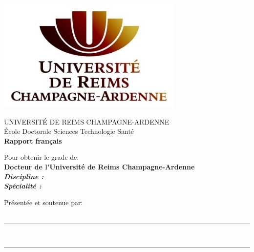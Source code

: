 \documentclass[12pt,a4paper]{report}
\begin{document}
{
\centering

{
	\includegraphics[scale=1]{../figures/style/logo_urca_front_page.jpg}
	\vspace{0.3cm}
}

{
	UNIVERSIT\'E DE REIMS CHAMPAGNE-ARDENNE\\
	\vspace{0.5cm}
	\'Ecole Doctorale Sciences Technologie Sant\'e\\
	\vspace{.5cm}
	\huge
	\textbf{Rapport français}
	\vspace{.3cm}
}

{
	Pour obtenir le grade de:\\ 
	\vspace{.3cm}
	\Large 
	\textbf{Docteur de l'Université de Reims Champagne-Ardenne}\\
	\vspace{.3cm}
	\large
	\textbf{\textit{Discipline : }\phdDiscipline}\\
	\vspace{.3cm}
	\textbf{\textit{Sp\'ecialit\'e : }\phdSpeciality}
}

{
	\vspace{1cm}
	Pr\'esent\'ee et soutenue par:\\
	\vspace{.3cm}
	\Large
	\textbf{\phdAuthor}\\
	\vspace{.3cm}
	\large
	\vspace{.5cm}	
}

{
	\hrule height 2pt
	\vspace{2pt}
	\huge 
	\vspace{.8cm}
	\phdTitleFR\\
	\large
	\vspace{.8cm}
	\hrule
	\vspace{.8cm}
}

}
\end{document}

